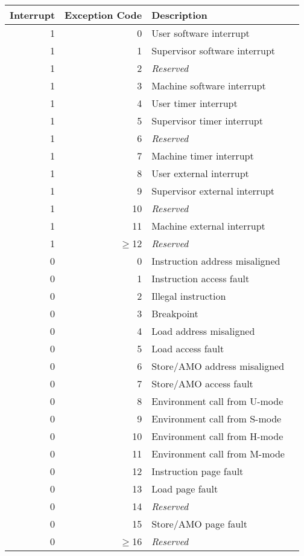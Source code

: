 \begin{table*}[h!]
\begin{center}
\begin{tabular}{|r|r|l|l|}

  \hline
  Interrupt & Exception Code  & Description \\
  \hline	 
  1         & 0               & User software interrupt \\
  1         & 1               & Supervisor software interrupt \\
  1         & 2               & {\em Reserved} \\ \hline
  1         & 3               & Machine software interrupt \\
  1         & 4               & User timer interrupt \\
  1         & 5               & Supervisor timer interrupt \\
  1         & 6               & {\em Reserved} \\ \hline
  1         & 7               & Machine timer interrupt \\
  1         & 8               & User external interrupt \\
  1         & 9               & Supervisor external interrupt \\
  1         & 10              & {\em Reserved} \\ \hline
  1         & 11              & Machine external interrupt \\
  1         & $\ge$12         & {\em Reserved} \\ \hline
  0         & 0               & Instruction address misaligned \\
  0         & 1               & Instruction access fault \\
  0         & 2               & Illegal instruction \\   
  0         & 3               & Breakpoint \\
  0         & 4               & Load address misaligned \\
  0         & 5               & Load access fault \\
  0         & 6               & Store/AMO address misaligned \\
  0         & 7               & Store/AMO access fault \\
  0         & 8               & Environment call from U-mode\\
  0         & 9               & Environment call from S-mode \\
  0         & 10              & Environment call from H-mode \\
  0         & 11              & Environment call from M-mode \\
  0         & 12              & Instruction page fault \\
  0         & 13              & Load page fault \\
  0         & 14              & {\em Reserved} \\
  0         & 15              & Store/AMO page fault \\
  0         & $\ge$16         & {\em Reserved} \\
  \hline


\end{tabular}
\end{center}
\end{table*}
